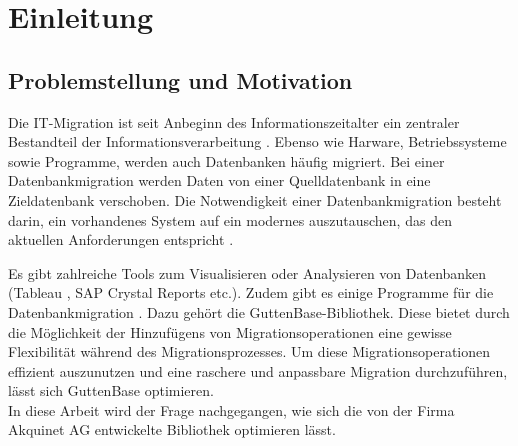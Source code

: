 \chapter{Einleitung}

\section{Problemstellung und Motivation}


Die IT-Migration ist seit Anbeginn des Informationszeitalter ein zentraler Bestandteil der Informationsverarbeitung \cite{wachter2015systemkonsolidierung}. Ebenso wie Harware, Betriebssysteme sowie Programme, werden auch Datenbanken häufig migriert. Bei einer Datenbankmigration werden Daten von einer Quelldatenbank in eine Zieldatenbank verschoben. Die Notwendigkeit einer Datenbankmigration besteht darin, ein vorhandenes System auf ein modernes auszutauschen, das den aktuellen Anforderungen entspricht \cite{housel1974architecture}.

Es gibt zahlreiche Tools zum Visualisieren oder Analysieren von  Datenbanken (Tableau \cite{datig2018telling}, SAP Crystal Reports \cite{duttaroy2016sap} etc.). Zudem gibt es einige Programme für die Datenbankmigration \cite{horstmann2005migration}. Dazu gehört die GuttenBase-Bibliothek. Diese bietet durch die Möglichkeit der Hinzufügens von Migrationsoperationen eine gewisse Flexibilität während des Migrationsprozesses. Um diese Migrationsoperationen effizient auszunutzen und eine raschere und anpassbare Migration durchzuführen, lässt sich GuttenBase optimieren. \\ In diese Arbeit wird der Frage nachgegangen, wie sich die von der Firma Akquinet AG entwickelte Bibliothek optimieren lässt.
